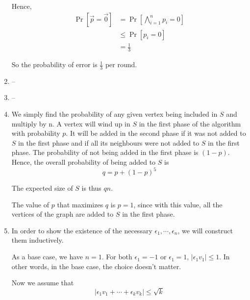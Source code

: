 \documentclass[letterpaper,11pt]{article}
\begin{document}
\begin{enumerate}
        Hence,
        \begin{align*}
            \Pr{[\vec p = \vec 0]}
            &= \Pr{[\bigwedge_{i = 1}^n p_i = 0]} \\
                &\leq \Pr{[p_i = 0]} \\
                &= \frac{1}{3}
        \end{align*}

        So the probability of error is $\frac{1}{3}$ per round.

    \item
        --

    \item
        --

    \item
        We simply find the probability of any given vertex being included in
        $S$ and multiply by n. A vertex will wind up in $S$ in the first
        phase of the algorithm with probability $p$. It will be added in the
        second phase if it was not added to $S$ in the first phase and if all
        its neighbours were not added to $S$ in the first phase. The
        probability of not being added in the first phase is $(1 - p)$. Hence,
        the overall probability of being added to $S$ is
        $$q = p + (1 - p)^5$$

        The expected size of $S$ is thus $qn$.

        The value of $p$ that maximizes $q$ is $p = 1$, since with this value,
        all the vertices of the graph are added to $S$ in the first phase.
        
    \item
        In order to show the existence of the necessary
        $\epsilon_1, \cdots, \epsilon_n$, we will construct them inductively.

        As a base case, we have $n = 1$. For both $\epsilon_1 = -1$ or
        $\epsilon_1 = 1$, $|\epsilon_1 v_1| \leq 1$. In other words, in the
        base case, the choice doesn't matter.

        Now we assume that
        $$|\epsilon_1 v_1 + \cdots + \epsilon_k v_k| \leq \sqrt{k}$$


\end{enumerate}
\end{document}
